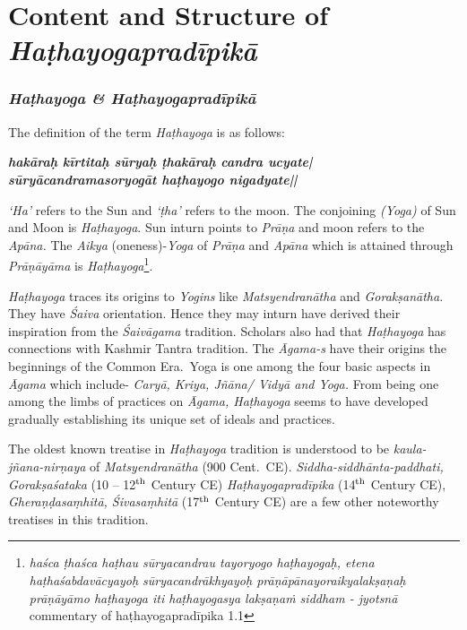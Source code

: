 \part{Content and Structure of \textit{Haṭhayogapradīpikā}}


\section*{\textit{Haṭhayoga \&  Haṭhayogapradīpikā}}

The definition of the term \textit{Haṭhayoga} is as follows:

\begin{shloka}
\textit{\textbf{hakāraḥ kīrtitaḥ sūryaḥ ṭhakāraḥ candra ucyate|}}\\
\textit{\textbf{sūryācandramasoryogāt haṭhayogo nigadyate||}}

\end{shloka}

\textit{`Ha'} refers to the Sun and \textit{`ṭha'} refers to the moon. The conjoining \textit{(Yoga)} of Sun and Moon is \textit{Haṭhayoga}. Sun inturn points to \textit{Prāṇa} and moon refers to the \textit{Apāna.} The \textit{Aikya} (oneness)-\textit{Yoga} of \textit{Prāṇa} and \textit{Apāna} which is attained through \textit{Prāṇāyāma} is \textit{Haṭhayoga}\footnote{\textit{haśca ṭhaśca haṭhau sūryacandrau tayoryogo haṭhayogaḥ, etena haṭhaśabdavācyayoḥ sūryacandrākhyayoḥ prāṇāpānayoraikyalakṣaṇaḥ prāṇāyāmo haṭhayoga iti haṭhayogasya lakṣaṇaṁ siddham  - jyotsnā} commentary of haṭhayogapradīpika 1.1}.

\textit{Haṭhayoga} traces its origins to \textit{Yogins} like \textit{Matsyendranātha} and \textit{Gorakṣanātha.} They have \textit{Śaiva} orientation. Hence they may inturn have derived their inspiration from the \textit{Śaivāgama} tradition. Scholars also had that \textit{Haṭhayoga} has connections with Kashmir Tantra tradition.  The \textit{Āgama-s} have their origins the beginnings of the Common Era.\ Yoga is one among the four basic aspects in \textit{Āgama} which include- \textit{Caryā, Kriya, Jñāna/ Vidyā and Yoga.} From being one among the limbs of practices on \textit{Āgama, Haṭhayoga} seems to have developed gradually establishing its unique set of ideals and practices.

The oldest known treatise in \textit{Haṭhayoga} tradition is understood to be \textit{kaula-jñana-nirṇaya} of \textit{Matsyendranātha} (900 Cent.\ CE). \textit{Siddha-\break siddhānta-paddhati, Gorakṣaśataka} (10 -- 12$^{\rm th}$ Century CE) \textit{Haṭha\-yoga\-pra\-dī\-pika} (14$^{\rm th}$ Century CE), \textit{Gheraṇḍasaṃhitā, Śivasaṃhitā} (17$^{\rm th}$ Century CE) are a few other noteworthy treatises in this tradition.


